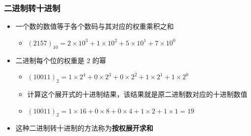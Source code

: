 \begin{frame}[fragile]
    \frametitle{二进制转十进制}

    \begin{itemize}
        \item 一个数的数值等于各个数码与其对应的权重乘积之和
        \begin{itemize}
           \item $(2157)_{10} = 2 \times 10^3 + 1 \times 10^2 + 5 \times 10^1 + 7 \times 10^0$
        \end{itemize}
        \item<2-> 二进制每个位的权重是 2 的幂
        \begin{itemize}
           \item $(10011)_{2} = 1 \times 2^4 + 0 \times 2^3 + 0 \times 2^2 + 1 \times 2^1 + 1 \times 2^0$
           \item 计算这个展开式的十进制结果，该结果就是原二进制数对应的十进制数值
           \item $(10011)_{2} = 1 \times 16 + 0 \times 8 + 0 \times 4 + 1 \times 2 + 1 \times 1 = 19$
        \end{itemize}
        \item<3-> 这种二进制转十进制的方法称为\textbf{按权展开求和}
    \end{itemize}

\end{frame}

